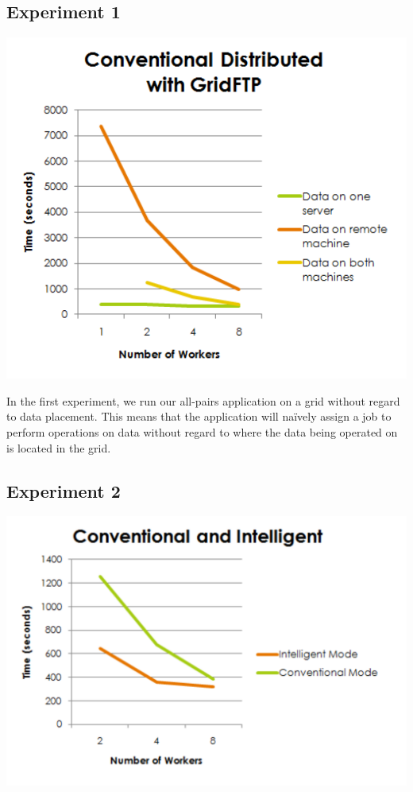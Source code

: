 \documentclass[a4paper,11pt]{article} \usepackage[utf8]{inputenc}
\begin{document}
\subsection{Experiment 1}

\includegraphics{ConventionalDistributed.pdf}

In the first experiment, we run our all-pairs application on a grid
without regard to data placement.  This means that the application will
naïvely assign a job to perform operations on data without regard to
where the data being operated on is located in the grid.  

\subsection{Experiment 2}

\includegraphics{ConventionalIntelligent.pdf}
\end{document}
